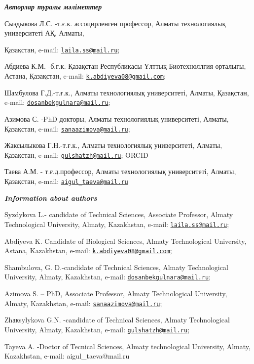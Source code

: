 \emph{{\bfseries Авторлар туралы мәліметтер}}

Сыздыкова Л.С. -т.ғ.к. ассоцирленген профессор, Алматы технологиялық
университеті АҚ, Алматы,

Қазақстан, e-mail:
\href{mailto:laila.ss@mail.ru}{\nolinkurl{laila.ss@mail.ru}};

Абдиева К.М. -б.ғ.к. Қазақстан Республикасы Ұлттық Биотехноллгия
орталығы, Астана, Қазақстан, e-mail:
\href{mailto:k.abdiyeva08@gmail.com}{\nolinkurl{k.abdiyeva08@gmail.com}};

Шамбулова Г.Д.-т.ғ.к., Алматы технологиялық университеті, Алматы,
Қазақстан, e-mail:
\href{mailto:dosanbekgulnara@mail.ru}{\nolinkurl{dosanbekgulnara@mail.ru}};

Азимова С. -PhD докторы, Алматы технологиялық университеті, Алматы,
Қазақстан, e-mail:
\href{mailto:sanaazimova@mail.ru}{\nolinkurl{sanaazimova@mail.ru}};

Жаксылыкова Г.Н.-т.ғ.к., Алматы технологиялық университеті, Алматы,
Қазақстан, e-mail:
\href{mailto:gulshatzh@mail.ru}{\nolinkurl{gulshatzh@mail.ru}}; ORCID

Таева А.М. - т.ғ.д.профессор, Алматы технологиялық университеті, Алматы,
Қазақстан, e-mail:
\href{mailto:aigul_taeva@mail.ru}{\nolinkurl{aigul\_taeva@mail.ru}}

\emph{{\bfseries Information about authors}}

Syzdykova L.- candidate of Technical Sciences, Associate Professor,
Almaty Technological University, Almaty, Kazakhstan, e-mail:
\href{mailto:laila.ss@mail.ru}{\nolinkurl{laila.ss@mail.ru}};

Abdiyeva K. Candidate of Biological Sciences, Almaty Technological
University, Astana, Kazakhstan, e-mail:
\href{mailto:k.abdiyeva08@gmail.com}{\nolinkurl{k.abdiyeva08@gmail.com}};

Shambulova, G. D.-candidate of Technical Sciences, Almaty Technological
University, Almaty, Kazakhstan, e-mail:
\href{mailto:dosanbekgulnara@mail.ru}{\nolinkurl{dosanbekgulnara@mail.ru}};

Azimova S. -- PhD, Associate Professor, Almaty Technological University,
Almaty, Kazakhstan, e-mail:
\href{mailto:sanaazimova@mail.ru}{\nolinkurl{sanaazimova@mail.ru}};

Zhакsylykova G.N. -candidate of Technical Sciences, Almaty Technological
University, Almaty, Kazakhstan, e-mail:
\href{mailto:gulshatzh@mail.ru}{\nolinkurl{gulshatzh@mail.ru}};

Tayeva A. -Doctor of Tecnical Sciences, Almaty technological University,
Almaty, Kazakhstan, e-mail: aigul\_taeva@mail.ru\